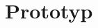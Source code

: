 \documentclass[Bachelorarbeit.tex]{subfiles}
\begin{document}
\chapter{Prototyp}
\label{bilderPrototyp}
\end{document}
